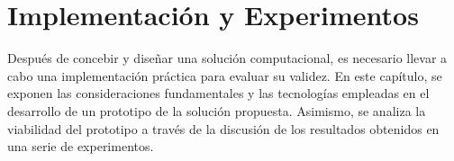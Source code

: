 \chapter{Implementación y Experimentos}\label{chapter:implementation}

Después de concebir y diseñar una solución computacional, es necesario llevar a cabo una implementación 
práctica para evaluar su validez. En este capítulo, se exponen las consideraciones fundamentales y 
las tecnologías empleadas en el desarrollo de un prototipo de la solución propuesta. Asimismo, se analiza 
la viabilidad del prototipo a través de la discusión de los resultados obtenidos en una serie de experimentos.




